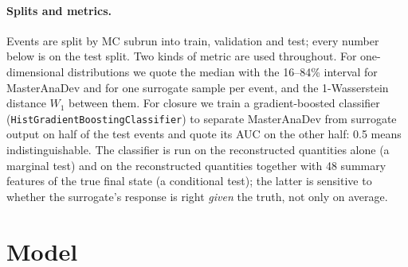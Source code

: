 \documentclass[11pt]{article}
\begin{document}
\paragraph{Splits and metrics.} Events are split by MC subrun into train, validation and test; every number
below is on the test split. Two kinds of metric are used throughout. For one-dimensional distributions we quote
the median with the 16--84\% interval for MasterAnaDev and for one surrogate sample per event, and the
1-Wasserstein distance $W_1$ between them. For closure we train a gradient-boosted classifier
(\texttt{HistGradientBoostingClassifier}) to separate MasterAnaDev from surrogate output on half of the test
events and quote its AUC on the other half: 0.5 means indistinguishable. The classifier is run on the
reconstructed quantities alone (a marginal test) and on the reconstructed quantities together with 48 summary
features of the true final state (a conditional test); the latter is sensitive to whether the surrogate's
response is right \emph{given} the truth, not only on average.

\section{Model}
\label{sec:model}
\end{document}
